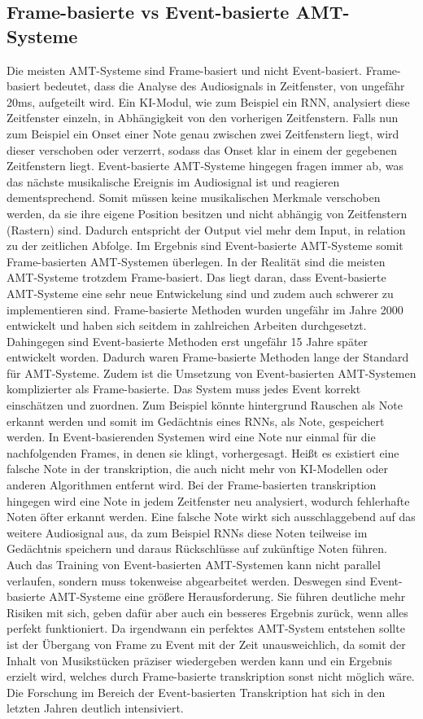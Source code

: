 \subsection{Frame-basierte vs Event-basierte AMT-Systeme}
Die meisten AMT-Systeme sind Frame-basiert und nicht Event-basiert.
Frame-basiert bedeutet, dass die Analyse des Audiosignals in Zeitfenster, von ungefähr 20ms, aufgeteilt wird.
Ein KI-Modul, wie zum Beispiel ein RNN, analysiert diese Zeitfenster einzeln,
in Abhängigkeit von den vorherigen Zeitfenstern.
Falls nun zum Beispiel ein Onset einer Note genau zwischen zwei Zeitfenstern liegt,
wird dieser verschoben oder verzerrt, sodass das Onset klar in einem der gegebenen Zeitfenstern liegt.
Event-basierte AMT-Systeme hingegen fragen immer ab,
was das nächste musikalische Ereignis im Audiosignal ist und reagieren dementsprechend.
Somit müssen keine musikalischen Merkmale verschoben werden,
da sie ihre eigene Position besitzen und nicht abhängig von Zeitfenstern (Rastern) sind.
Dadurch entspricht der Output viel mehr dem Input, in relation zu der zeitlichen Abfolge.
Im Ergebnis sind Event-basierte AMT-Systeme somit Frame-basierten AMT-Systemen überlegen.
In der Realität sind die meisten AMT-Systeme trotzdem Frame-basiert.
Das liegt daran, dass Event-basierte AMT-Systeme eine sehr neue Entwickelung sind
und zudem auch schwerer zu implementieren sind.
Frame-basierte Methoden wurden ungefähr im Jahre 2000 entwickelt
und haben sich seitdem in zahlreichen Arbeiten durchgesetzt.
\cite{Martin1996, klapuri1998automatic}
Dahingegen sind Event-basierte Methoden erst ungefähr 15 Jahre später entwickelt worden.
\cite{performance_rnn2017event}
Dadurch waren Frame-basierte Methoden lange der Standard für AMT-Systeme.
Zudem ist die Umsetzung von Event-basierten AMT-Systemen komplizierter als Frame-basierte.
Das System muss jedes Event korrekt einschätzen und zuordnen.
Zum Beispiel könnte hintergrund Rauschen als Note erkannt werden und somit im
Gedächtnis eines RNNs, als Note, gespeichert werden.
In Event-basierenden Systemen wird eine Note nur einmal für die nachfolgenden Frames, in denen sie klingt, vorhergesagt.
Heißt es existiert eine falsche Note in der transkription,
die auch nicht mehr von KI-Modellen oder anderen Algorithmen entfernt wird.
Bei der Frame-basierten transkription hingegen wird eine Note in jedem Zeitfenster neu analysiert,
wodurch fehlerhafte Noten öfter erkannt werden.
Eine falsche Note wirkt sich ausschlaggebend auf das weitere Audiosignal aus,
da zum Beispiel RNNs diese Noten teilweise im Gedächtnis speichern und daraus Rückschlüsse auf zukünftige Noten führen.
Auch das Training von Event-basierten AMT-Systemen kann nicht parallel verlaufen,
sondern muss tokenweise abgearbeitet werden.
Deswegen sind Event-basierte AMT-Systeme eine größere Herausforderung.
Sie führen deutliche mehr Risiken mit sich, geben dafür aber auch ein besseres Ergebnis zurück, wenn alles perfekt funktioniert.
Da irgendwann ein perfektes AMT-System entstehen sollte ist der Übergang von
Frame zu Event mit der Zeit unausweichlich, da somit der Inhalt von Musikstücken
präziser wiedergeben werden kann und ein Ergebnis erzielt wird,
welches durch Frame-basierte transkription sonst nicht möglich wäre.
Die Forschung im Bereich der Event-basierten Transkription hat sich in den letzten Jahren deutlich intensiviert.


